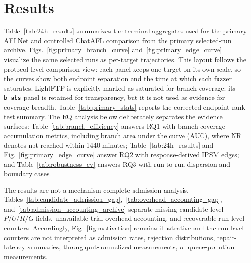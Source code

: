 \documentclass[final,5p,times,number]{elsarticle}
\newcommand{\figref}[1]{\hyperref[#1]{Fig.~\ref*{#1}}}
\newcommand{\figsref}[2]{\hyperref[#1]{Figs.~\ref*{#1}} and~\hyperref[#2]{\ref*{#2}}}
\begin{document}
\section{Results}

Table~\ref{tab:24h_results} summarizes the terminal aggregates used for the primary AFLNet and controlled ChatAFL comparison from the primary selected-run archive. \figsref{fig:primary_branch_curve}{fig:primary_edge_curve} visualize the same selected runs as per-target trajectories. This layout follows the protocol-level comparison view: each panel keeps one target on its own scale, so the curves show both endpoint separation and the time at which each fuzzer saturates. LightFTP is explicitly marked as saturated for branch coverage: its \texttt{b\_abs} panel is retained for transparency, but it is not used as evidence for coverage breadth. Table~\ref{tab:primary_stats} reports the corrected endpoint rank-test summary. The RQ analysis below deliberately separates the evidence surfaces: Table~\ref{tab:branch_efficiency} answers RQ1 with branch-coverage accumulation metrics, including branch area under the curve (AUC), where NR denotes not reached within 1440 minutes; Table~\ref{tab:24h_results} and \figref{fig:primary_edge_curve} answer RQ2 with response-derived IPSM edges; and Table~\ref{tab:robustness_cv} answers RQ3 with run-to-run dispersion and boundary cases.

The results are not a mechanism-complete admission analysis. Tables~\ref{tab:candidate_admission_gap},~\ref{tab:overhead_accounting_gap}, and~\ref{tab:admission_accounting_archive} separate missing candidate-level $P/U/R/G$ fields, unavailable trial-overhead accounting, and recoverable run-level counters. Accordingly, \figref{fig:motivation} remains illustrative and the run-level counters are not interpreted as admission rates, rejection distributions, repair-latency summaries, throughput-normalized measurements, or queue-pollution measurements.
\end{document}
